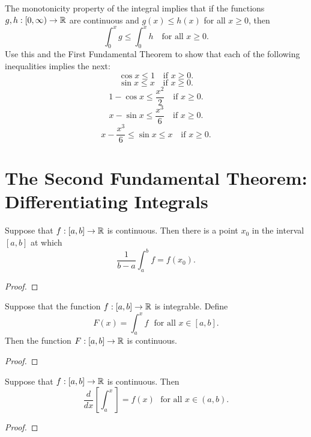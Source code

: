 \documentclass[letterpaper, twoside, 12pt]{book}
\begin{document}
\begin{exercise}[5]
  The monotonicity property of the integral implies that if the functions
  \(g,h:[0,\infty)\to\mathbb R\) are continuous and \(g(x)\leq h(x)\) for all
  \(x\geq 0\), then
  \[
    \int_0^x g\leq \int_0^x h
    \text{~~ for all~} x\geq 0
  .\]
  Use this and the First Fundamental Theorem to show that each of the following
  inequalities implies the next:
  \[
    \cos x \leq 1
    \text{~~ if~} x\geq 0
  .\]
  \[
    \sin x \leq x
    \text{~~ if~} x\geq 0
  .\]
  \[
    1-\cos x \leq \frac{x^2}{2}
    \text{~~ if~} x\geq 0
  .\]
  \[
    x-\sin x \leq \frac{x^3}{6}
    \text{~~ if~} x\geq 0
  .\]
  \[
    x-\frac{x^3}{6} \leq \sin x \leq x
    \text{~~ if~} x\geq 0
  .\]
\end{exercise}




\section{The Second Fundamental Theorem: Differentiating Integrals}


\begin{theorem}
  Suppose that \(f:[a,b]\to\mathbb R\) is continuous. Then there is a point \(x_0\)
  in the interval \([a,b]\) at which
  \[
    \frac{1}{b-a}\int_a^b f
      =
    f(x_0)
  .\]
\end{theorem}
\begin{proof}

\end{proof}


\begin{proposition}[6.27]
  Suppose that the function \(f:[a,b]\to\mathbb R\) is integrable. Define
  \[
    F(x) = \int_a^x f
    \text{~~for all~} x\in[a,b]
  .\]
  Then the function \(F:[a,b]\to\mathbb R\) is continuous.
\end{proposition}
\begin{proof}

\end{proof}


\begin{theorem}
  Suppose that \(f:[a,b]\to\mathbb R\) is continuous. Then
  \[
    \frac{d}{dx}\left[\int_a^x\right]
      =
    f(x)
    \text{~~for all~} x\in(a,b)
  .\]
\end{theorem}
\begin{proof}

\end{proof}
\end{document}
